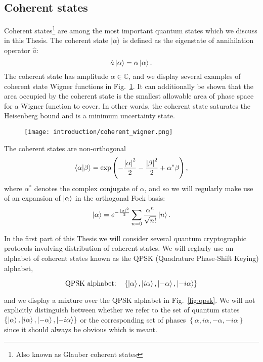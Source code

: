 \FloatBarrier
\subsection{Coherent states}
Coherent states\footnote{Also known as Glauber coherent states} are among the most important quantum states which we discuss in this Thesis. The coherent state $\ket{\alpha}$ is defined as the eigenstate of annihilation operator $\hat{a}$:
\begin{equation}
\hat{a}\ket{\alpha} = \alpha \ket{\alpha}.
\end{equation}
The coherent state has amplitude $\alpha \in \mathbb{C}$, and we display several examples of coherent state Wigner functions in Fig.~\ref{fig:intro_coherent_wigner}. It can additionally be shown that the area occupied by the coherent state is the smallest allowable area of phase space for a Wigner function to cover. In other words, the coherent state saturates the Heisenberg bound and is a minimum uncertainty state.

\begin{figure}[htp]
\centering
\texttt{[image: introduction/coherent\_wigner.png]}
\caption{\label{fig:intro_coherent_wigner}}
\end{figure}

The coherent states are non-orthogonal
\begin{equation}
\ip{\alpha}{\beta} = \exp\left(- \frac{\left|\alpha\right|^2}{2} - \frac{\left|\beta\right|^2}{2} + \alpha^* \beta \right),
\end{equation}
where $\alpha^*$ denotes the complex conjugate of $\alpha$, and so we will regularly make use of an expansion of $\ket{\alpha}$ in the orthogonal Fock basis:
\begin{equation}\label{eqn:intro_coherent_fock}
\ket{\alpha} = e^{-\frac{\left|\alpha\right|^2}{2}} \sum_{n=0} \frac{\alpha^n}{\sqrt{n!}} \ket{n}.
\end{equation}

\noindent In the first part of this Thesis we will consider several quantum cryptographic protocols involving distribution of coherent states. We will reglarly use an alphabet of coherent states known as the QPSK (Quadrature Phase-Shift Keying) alphabet, 

\begin{equation}
\qq*{QPSK alphabet:} \left\{\ket{\alpha}, \ket{i \alpha}, \ket{- \alpha}, \ket{- i \alpha}\right\}
\end{equation}

and we display a mixture over the QPSK alphabet in Fig.~\ref{fig:qpsk}. We will not explicitly distinguish between whether we refer to the set of quantum states $\left\{\ket{\alpha}, \ket{i \alpha}, \ket{- \alpha}, \ket{- i \alpha}\right\}$ or the corresponding set of phases $\left\{ \alpha, i \alpha, -\alpha, - i\alpha\right\}$ since it should always be obvious which is meant.

